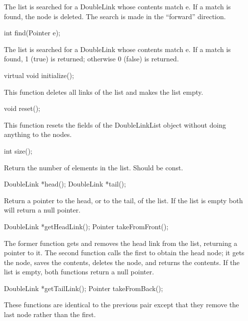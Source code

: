 The list is searched for a DoubleLink whose contents match e.  If
a match is found, the node is deleted.  The search is made in the
``forward'' direction.

\begin{example}
int find(Pointer e);
\end{example}

The list is searched for a DoubleLink whose contents match e.  If
a match is found, 1 (true) is returned; otherwise 0 (false) is
returned.

\begin{example}
virtual void initialize();
\end{example}

This function deletes all links of the list and makes the list empty.

\begin{example}
void reset();
\end{example}

This function resets the fields of the DoubleLinkList object without
doing anything to the nodes.

\begin{example}
int size();
\end{example}

Return the number of elements in the list.  Should be const.

\begin{example}
DoubleLink *head();
DoubleLink *tail();
\end{example}

Return a pointer to the head, or to the tail, of the list.  If
the list is empty both will return a null pointer.

\begin{example}
DoubleLink *getHeadLink();
Pointer takeFromFront();
\end{example}

The former function gets and removes the head link from the list,
returning a pointer to it.  The second function calls the first
to obtain the head node; it gets the node, saves the contents,
deletes the node, and returns the contents.  If the list is empty,
both functions return a null pointer.

\begin{example}
DoubleLink *getTailLink();
Pointer takeFromBack();
\end{example}

These functions are identical to the previous pair except that
they remove the last node rather than the first.

